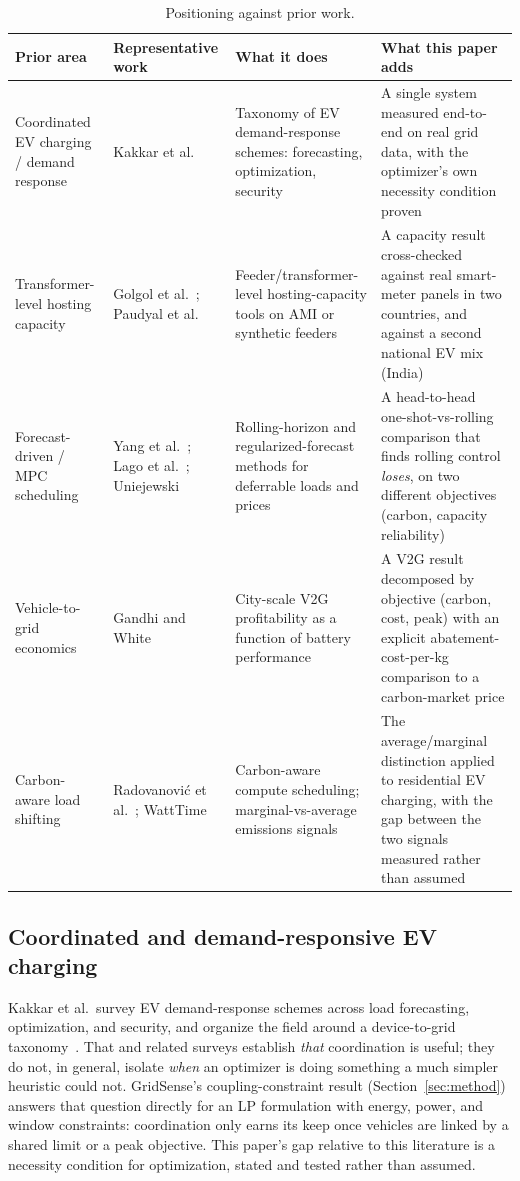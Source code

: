 \documentclass[journal]{IEEEtran}
\begin{document}
\begin{table}[t]
\centering
\caption{Positioning against prior work.}
\label{tab:positioning}
\begin{tabular}{p{2.6cm}p{4.3cm}p{5.0cm}p{4.6cm}}
\toprule
\textbf{Prior area} & \textbf{Representative work} & \textbf{What it does} & \textbf{What this paper adds} \\
\midrule
Coordinated EV charging / demand response & Kakkar et al.~\cite{kakkar2024} & Taxonomy of EV demand-response schemes: forecasting, optimization, security & A single system measured end-to-end on real grid data, with the optimizer's own necessity condition proven \\
Transformer-level hosting capacity & Golgol et al.~\cite{golgol2024}; Paudyal et al.~\cite{paudyal2021} & Feeder/transformer-level hosting-capacity tools on AMI or synthetic feeders & A capacity result cross-checked against real smart-meter panels in two countries, and against a second national EV mix (India) \\
Forecast-driven / MPC scheduling & Yang et al.~\cite{yang2020bmpc}; Lago et al.~\cite{lago2021}; Uniejewski~\cite{uniejewski2024} & Rolling-horizon and regularized-forecast methods for deferrable loads and prices & A head-to-head one-shot-vs-rolling comparison that finds rolling control \emph{loses}, on two different objectives (carbon, capacity reliability) \\
Vehicle-to-grid economics & Gandhi and White~\cite{gandhi2021v2g} & City-scale V2G profitability as a function of battery performance & A V2G result decomposed by objective (carbon, cost, peak) with an explicit abatement-cost-per-kg comparison to a carbon-market price \\
Carbon-aware load shifting & Radovanovi{\'c} et al.~\cite{radovanovic2021}; WattTime~\cite{watttime_moer} & Carbon-aware compute scheduling; marginal-vs-average emissions signals & The average/marginal distinction applied to residential EV charging, with the gap between the two signals measured rather than assumed \\
\bottomrule
\end{tabular}
\end{table}

\subsection{Coordinated and demand-responsive EV charging}
Kakkar et al.\ survey EV demand-response schemes across load forecasting, optimization, and security, and organize the field around a device-to-grid taxonomy~\cite{kakkar2024}. That and related surveys establish \emph{that} coordination is useful; they do not, in general, isolate \emph{when} an optimizer is doing something a much simpler heuristic could not. GridSense's coupling-constraint result (Section~\ref{sec:method}) answers that question directly for an LP formulation with energy, power, and window constraints: coordination only earns its keep once vehicles are linked by a shared limit or a peak objective. This paper's gap relative to this literature is a necessity condition for optimization, stated and tested rather than assumed.
\end{document}
